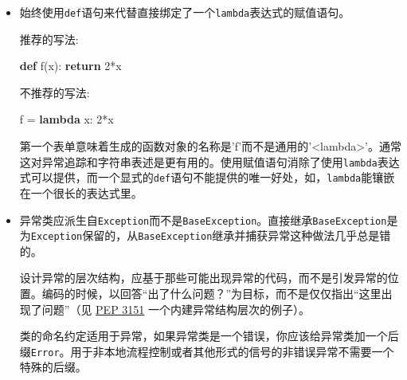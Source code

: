 \documentclass[ignorenonframetext,9pt]{beamer}
\newenvironment{Shaded}{}{}
\newcommand{\ControlFlowTok}[1]{\textcolor[rgb]{0.00,0.44,0.13}{\textbf{#1}}}
\newcommand{\DecValTok}[1]{\textcolor[rgb]{0.25,0.63,0.44}{#1}}
\newcommand{\KeywordTok}[1]{\textcolor[rgb]{0.00,0.44,0.13}{\textbf{#1}}}
\newcommand{\NormalTok}[1]{#1}
\newcommand{\OperatorTok}[1]{\textcolor[rgb]{0.40,0.40,0.40}{#1}}
\begin{document}
\begin{frame}[fragile]

\begin{itemize}
\item
  始终使用\texttt{def}语句来代替直接绑定了一个\texttt{lambda}表达式的赋值语句。

  推荐的写法:

\begin{Shaded}
\begin{Highlighting}[]
\KeywordTok{def}\NormalTok{ f(x): }\ControlFlowTok{return} \DecValTok{2}\OperatorTok{*}\NormalTok{x}
\end{Highlighting}
\end{Shaded}

  不推荐的写法:

\begin{Shaded}
\begin{Highlighting}[]
\NormalTok{f }\OperatorTok{=} \KeywordTok{lambda}\NormalTok{ x: }\DecValTok{2}\OperatorTok{*}\NormalTok{x}
\end{Highlighting}
\end{Shaded}

  第一个表单意味着生成的函数对象的名称是'f'而不是通用的'\textless{}lambda\textgreater{}'。通常这对异常追踪和字符串表述是更有用的。使用赋值语句消除了使用\texttt{lambda}表达式可以提供，而一个显式的\texttt{def}语句不能提供的唯一好处，如，\texttt{lambda}能镶嵌在一个很长的表达式里。
\end{itemize}

\end{frame}

\begin{frame}[fragile]

\begin{itemize}
\item
  异常类应派生自\texttt{Exception}而不是\texttt{BaseException}。直接继承\texttt{BaseException}是为\texttt{Exception}保留的，从\texttt{BaseException}继承并捕获异常这种做法几乎总是错的。

  设计异常的层次结构，应基于那些可能出现异常的代码，而不是引发异常的位置。编码的时候，以回答``出了什么问题？''为目标，而不是仅仅指出``这里出现了问题''（见
  \href{https://www.python.org/dev/peps/pep-3151}{PEP 3151}
  一个内建异常结构层次的例子）。

  类的命名约定适用于异常，如果异常类是一个错误，你应该给异常类加一个后缀\texttt{Error}。用于非本地流程控制或者其他形式的信号的非错误异常不需要一个特殊的后缀。

\end{itemize}
\end{frame}
\end{document}
